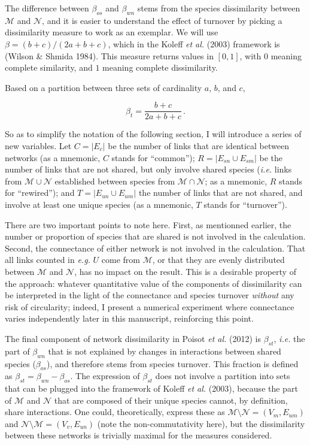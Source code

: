 \documentclass[11pt]{article}
\begin{document}
The difference between \(\beta_{os}\) and \(\beta_{wn}\) stems from the
species dissimilarity between \(\mathcal{M}\) and \(\mathcal{N}\), and
it is easier to understand the effect of turnover by picking a
dissimilarity measure to work as an exemplar. We will use
\(\beta = (b+c)/(2a+b+c)\), which in the Koleff \emph{et al.} (2003)
framework is (Wilson \& Shmida 1984). This measure returns values in
\([0,1]\), with \(0\) meaning complete similarity, and \(1\) meaning
complete dissimilarity.

Based on a partition between three sets of cardinality \(a\), \(b\), and
\(c\),

\[\beta_t = \frac{b+c}{2a+b+c}\,.\]

So as to simplify the notation of the following section, I will
introduce a series of new variables. Let \(C = |E_c|\) be the number of
links that are identical between networks (as a mnemonic, \(C\) stands
for ``common''); \(R = |E_{sn} \cup E_{sm}|\) be the number of links
that are not shared, but only involve shared species (\emph{i.e.} links
from \(\mathcal{M}\cup\mathcal{N}\) established between species from
\(\mathcal{M}\cap\mathcal{N}\); as a mnemonic, \(R\) stands for
``rewired''); and \(T = |E_{un} \cup E_{um}|\) the number of links that
are not shared, and involve at least one unique species (as a mnemonic,
\(T\) stands for ``turnover'').

There are two important points to note here. First, as mentionned
earlier, the number or proportion of species that are shared is not
involved in the calculation. Second, the connectance of either network
is not involved in the calculation. That all links counted in
\emph{e.g.} \(U\) come from \(\mathcal{M}\), or that they are evenly
distributed between \(\mathcal{M}\) and \(\mathcal{N}\), has no impact
on the result. This is a desirable property of the approach: whatever
quantitative value of the components of dissimilarity can be interpreted
in the light of the connectance and species turnover \emph{without} any
risk of circularity; indeed, I present a numerical experiment where
connectance varies independently later in this manuscript, reinforcing
this point.

The final component of network dissimilarity in Poisot \emph{et al.}
(2012) is \(\beta_{st}\), \emph{i.e.} the part of \(\beta_{wn}\) that is
not explained by changes in interactions between shared species
(\(\beta_{os}\)), and therefore stems from species turnover. This
fraction is defined as \(\beta_{st} = \beta_{wn}-\beta_{os}\). The
expression of \(\beta_{st}\) does not involve a partition into sets that
can be plugged into the framework of Koleff \emph{et al.} (2003),
because the part of \(\mathcal{M}\) and \(\mathcal{N}\) that are
composed of their unique species cannot, by definition, share
interactions. One could, theoretically, express these as
\(\mathcal{M} \setminus \mathcal{N} = (V_m, E_{um})\) and
\(\mathcal{N} \setminus \mathcal{M} = (V_v, E_{un})\) (note the
non-commutativity here), but the dissimilarity between these networks is
trivially maximal for the measures considered.
\end{document}

